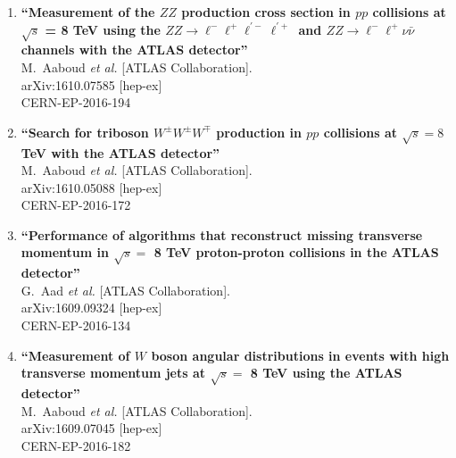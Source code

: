 \documentclass{article}
\begin{document}
\begin{enumerate}
\item%
{\bf ``Measurement of the $ZZ$ production cross section in $pp$ collisions at $\sqrt{s}$ = 8 TeV using the $ZZ\to\ell^{-}\ell^{+}\ell^{\prime -}\ell^{\prime +}$ and $ZZ\to\ell^{-}\ell^{+}\nu\bar{\nu}$ channels with the ATLAS detector''}
  \\{}M.~Aaboud {\it et al.} [ATLAS Collaboration].
  \\{}arXiv:1610.07585 [hep-ex]
  \\{}CERN-EP-2016-194

\item%
{\bf ``Search for triboson $W^{\pm}W^{\pm}W^{\mp}$ production in $pp$ collisions at $\sqrt{s}=8$ TeV with the ATLAS detector''}
  \\{}M.~Aaboud {\it et al.} [ATLAS Collaboration].
  \\{}arXiv:1610.05088 [hep-ex]
  \\{}CERN-EP-2016-172
\item%
{\bf ``Performance of algorithms that reconstruct missing transverse momentum in $\sqrt{s}=$ 8 TeV proton-proton collisions in the ATLAS detector''}
  \\{}G.~Aad {\it et al.} [ATLAS Collaboration].
  \\{}arXiv:1609.09324 [hep-ex]
  \\{}CERN-EP-2016-134
\item%
{\bf ``Measurement of $W$ boson angular distributions in events with high transverse momentum jets at $\sqrt{s}=$ 8 TeV using the ATLAS detector''}
  \\{}M.~Aaboud {\it et al.} [ATLAS Collaboration].
  \\{}arXiv:1609.07045 [hep-ex]
  \\{}CERN-EP-2016-182


\end{enumerate}
\end{document}
